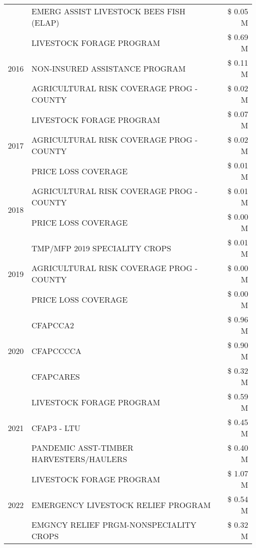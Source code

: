 \begin{tabular}{llr}
 & EMERG ASSIST LIVESTOCK BEES FISH (ELAP) & \$ 0.05 M \\
\cline{1-3}
\multirow[t]{3}{*}{2016} & LIVESTOCK FORAGE PROGRAM & \$ 0.69 M \\
 & NON-INSURED ASSISTANCE PROGRAM & \$ 0.11 M \\
 & AGRICULTURAL RISK COVERAGE PROG - COUNTY & \$ 0.02 M \\
\cline{1-3}
\multirow[t]{3}{*}{2017} & LIVESTOCK FORAGE PROGRAM & \$ 0.07 M \\
 & AGRICULTURAL RISK COVERAGE PROG - COUNTY & \$ 0.02 M \\
 & PRICE LOSS COVERAGE & \$ 0.01 M \\
\cline{1-3}
\multirow[t]{2}{*}{2018} & AGRICULTURAL RISK COVERAGE PROG - COUNTY & \$ 0.01 M \\
 & PRICE LOSS COVERAGE & \$ 0.00 M \\
\cline{1-3}
\multirow[t]{3}{*}{2019} & TMP/MFP 2019 SPECIALITY CROPS & \$ 0.01 M \\
 & AGRICULTURAL RISK COVERAGE PROG - COUNTY & \$ 0.00 M \\
 & PRICE LOSS COVERAGE & \$ 0.00 M \\
\cline{1-3}
\multirow[t]{3}{*}{2020} & CFAPCCA2 & \$ 0.96 M \\
 & CFAPCCCCA & \$ 0.90 M \\
 & CFAPCARES & \$ 0.32 M \\
\cline{1-3}
\multirow[t]{3}{*}{2021} & LIVESTOCK FORAGE PROGRAM & \$ 0.59 M \\
 & CFAP3 - LTU & \$ 0.45 M \\
 & PANDEMIC ASST-TIMBER HARVESTERS/HAULERS & \$ 0.40 M \\
\cline{1-3}
\multirow[t]{3}{*}{2022} & LIVESTOCK FORAGE PROGRAM & \$ 1.07 M \\
 & EMERGENCY LIVESTOCK RELIEF PROGRAM & \$ 0.54 M \\
 & EMGNCY RELIEF PRGM-NONSPECIALITY CROPS & \$ 0.32 M \\
\cline{1-3}
\bottomrule
\end{tabular}
